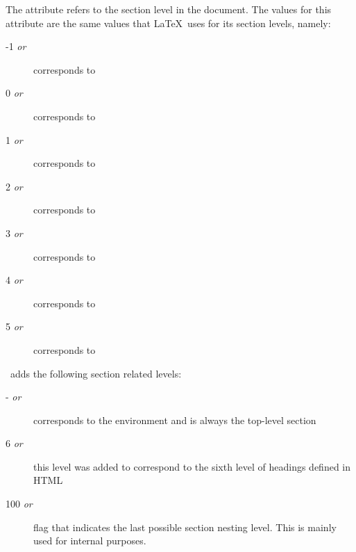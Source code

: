 The  attribute refers to the section level in the document.
The values for this attribute are the same values that \LaTeX\ uses
for its section levels, namely:
\begin{description}
\item[-1 {\it or} ] corresponds to 
\item[0 {\it or} ] corresponds to 
\item[1 {\it or} ] corresponds to 
\item[2 {\it or} ] corresponds to 
\item[3 {\it or} ] corresponds to 
\item[4 {\it or} ] corresponds to 
\item[5 {\it or} ] corresponds to 
\end{description}

\plasTeX\ adds the following section related levels:
\begin{description}
\item[- {\it or} ] 
    corresponds to the  environment and 
    is always the top-level section
\item[6 {\it or} ]
    this level was added to correspond to the sixth level of headings
    defined in HTML
\item[100 {\it or} ]
    flag that indicates the last possible section nesting level.  This is 
    mainly used for internal purposes.
\end{description}

